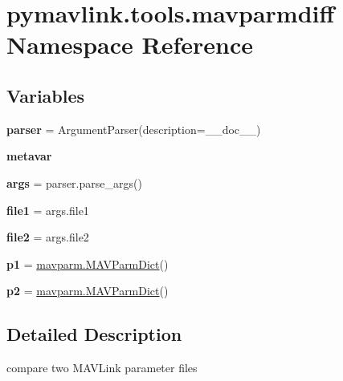 \hypertarget{namespacepymavlink_1_1tools_1_1mavparmdiff}{}\section{pymavlink.\+tools.\+mavparmdiff Namespace Reference}
\label{namespacepymavlink_1_1tools_1_1mavparmdiff}
\subsection*{Variables}
\begin{DoxyCompactItemize}
\item 
\mbox{\label{namespacepymavlink_1_1tools_1_1mavparmdiff_ab64e4537cb0136a6e8bf263f627bb94d}} 
{\bfseries parser} = Argument\+Parser(description=\+\_\+\+\_\+doc\+\_\+\+\_\+)
\item 
\mbox{\label{namespacepymavlink_1_1tools_1_1mavparmdiff_a68a751471fc698ef4fece1ff69d22945}} 
{\bfseries metavar}
\item 
\mbox{\label{namespacepymavlink_1_1tools_1_1mavparmdiff_abdc8d490a1a9a59241924f1be0a5315c}} 
{\bfseries args} = parser.\+parse\+\_\+args()
\item 
\mbox{\label{namespacepymavlink_1_1tools_1_1mavparmdiff_a94d7c01c0c30e2c1ab7be9b76fe353d6}} 
{\bfseries file1} = args.\+file1
\item 
\mbox{\label{namespacepymavlink_1_1tools_1_1mavparmdiff_af9bca462c4a011fa7aa1158d0c23425b}} 
{\bfseries file2} = args.\+file2
\item 
\mbox{\label{namespacepymavlink_1_1tools_1_1mavparmdiff_a06d51c19c63d03d6f2853641ffa5255a}} 
{\bfseries p1} = \hyperlink{classpymavlink_1_1mavparm_1_1MAVParmDict}{mavparm.\+M\+A\+V\+Parm\+Dict}()
\item 
\mbox{\label{namespacepymavlink_1_1tools_1_1mavparmdiff_a9f0235810198201674e23d7c0e6d4f3b}} 
{\bfseries p2} = \hyperlink{classpymavlink_1_1mavparm_1_1MAVParmDict}{mavparm.\+M\+A\+V\+Parm\+Dict}()
\end{DoxyCompactItemize}


\subsection{Detailed Description}
\begin{DoxyVerb}compare two MAVLink parameter files
\end{DoxyVerb}
 